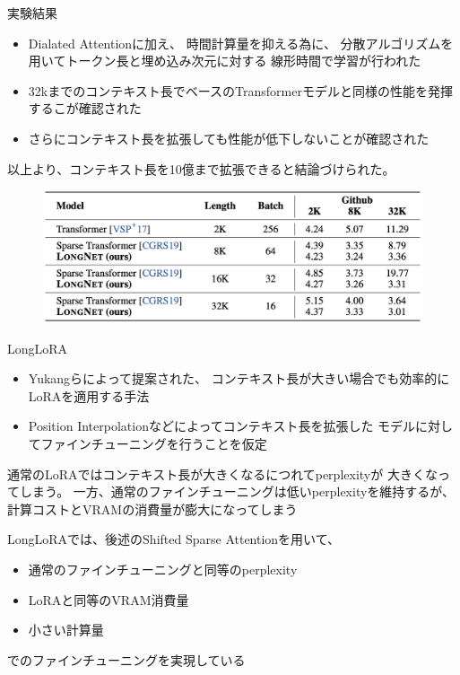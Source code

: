 \documentclass[dvipdfm, aspectratio=169]{beamer}
\begin{document}
    \begin{frame}{実験結果}
        \begin{itemize}
            \item{
                Dialated Attentionに加え、
                時間計算量を抑える為に、
                分散アルゴリズムを用いてトークン長と埋め込み次元に対する
                線形時間で学習が行われた
            }
            \item{
                32kまでのコンテキスト長でベースのTransformerモデルと同様の性能を発揮するこが確認された
            }
            \item{
                さらにコンテキスト長を拡張しても性能が低下しないことが確認された
            }
        \end{itemize}
        以上より、コンテキスト長を10億まで拡張できると結論づけられた。

        \begin{figure}[ht]
            \centering
            \includegraphics[width=.65\hsize]{longnet.png}
        \end{figure}
    \end{frame}
    \begin{frame}{LongLoRA}
        \begin{itemize}
            \item{
                Yukangらによって提案された、
                コンテキスト長が大きい場合でも効率的にLoRAを適用する手法
            }
            \item{
                Position Interpolationなどによってコンテキスト長を拡張した
                モデルに対してファインチューニングを行うことを仮定
            }
        \end{itemize}
        通常のLoRAではコンテキスト長が大きくなるにつれてperplexityが
        大きくなってしまう。
        一方、通常のファインチューニングは低いperplexityを維持するが、
        計算コストとVRAMの消費量が膨大になってしまう

        \begin{block}{}
            LongLoRAでは、後述のShifted Sparse Attentionを用いて、
            \begin{itemize}
                \item 通常のファインチューニングと同等のperplexity
                \item LoRAと同等のVRAM消費量
                \item 小さい計算量
            \end{itemize}
            でのファインチューニングを実現している
        \end{block}
    \end{frame}
\end{document}
